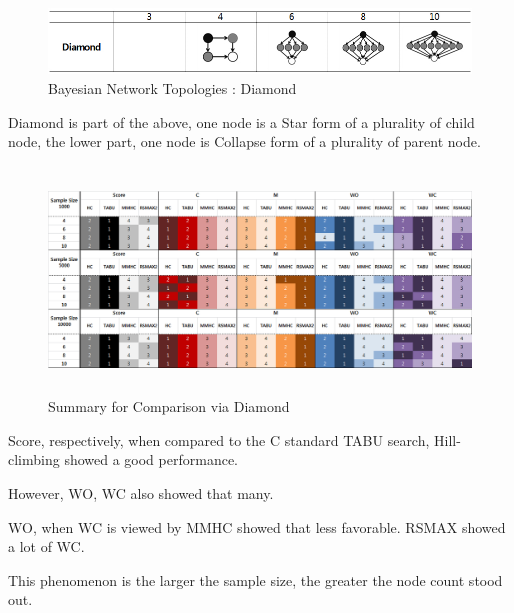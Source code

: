 	\begin{figure}[h]
	\centering
		\includegraphics[height=50pt]{Topologies_Diamond}
		\caption{Bayesian Network Topologies : Diamond}
	\end{figure}	

	Diamond is part of the above, one node is a Star form of a plurality of child node, the lower part, one node is Collapse form of a plurality of parent node.
	
\begin{figure}[!bhp]
	\centering
		\includegraphics[height=170pt]{Result_Diamond}
		\caption{Summary for Comparison via Diamond}
	\end{figure}	

Score, respectively, when compared to the C standard TABU search, Hill-climbing showed a good performance.

However, WO, WC also showed that many.

WO, when WC is viewed by MMHC showed that less favorable. RSMAX showed a lot of WC.

This phenomenon is the larger the sample size, the greater the node count stood out.
	
